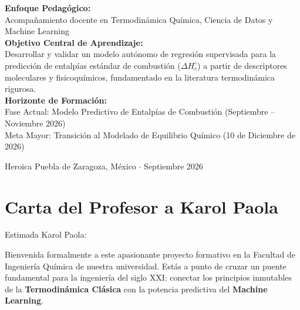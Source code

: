 \documentclass[11pt,letterpaper]{report}
\begin{document}
\begin{titlepage}
\begin{center}
        \begin{minipage}{0.88\textwidth}
            \centering
            \textbf{Enfoque Pedagógico:}\\
            Acompañamiento docente en Termodinámica Química, Ciencia de Datos y Machine Learning\\
            \vspace{0.3cm}
            \textbf{Objetivo Central de Aprendizaje:}\\
            Desarrollar y validar un modelo autónomo de regresión supervisada para la predicción de entalpías estándar de combustión ($\Delta H_c^\circ$) a partir de descriptores moleculares y fisicoquímicos, fundamentado en la literatura termodinámica rigurosa.\\
            \vspace{0.3cm}
            \textbf{Horizonte de Formación:}\\
            Fase Actual: Modelo Predictivo de Entalpías de Combustión (Septiembre -- Noviembre 2026)\\
            Meta Mayor: Transición al Modelado de Equilibrio Químico (10 de Diciembre de 2026)
        \end{minipage}

        \vspace{0.8cm}
        {\normalsize Heroica Puebla de Zaragoza, México $\cdot$ Septiembre 2026}
    \end{center}
\end{titlepage}

\tableofcontents
\newpage

\chapter*{Carta del Profesor a Karol Paola}

Estimada Karol Paola:

Bienvenida formalmente a este apasionante proyecto formativo en la Facultad de Ingeniería Química de nuestra universidad. Estás a punto de cruzar un puente fundamental para la ingeniería del siglo XXI: conectar los principios inmutables de la \textbf{Termodinámica Clásica} con la potencia predictiva del \textbf{Machine Learning}.
\end{document}
